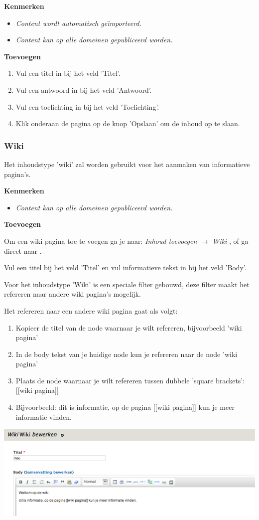 \textbf{Kenmerken}

\begin{itemize}
\item \emph{Content wordt automatisch ge{\"\i}mporteerd.}
\item \emph{Content kan op alle domeinen gepubliceerd worden.}
\end{itemize}

\textbf{Toevoegen}

\begin{enumerate}
\item Vul een titel in bij het veld 'Titel'.
\item Vul een antwoord in bij het veld 'Antwoord'.
\item Vul een toelichting in bij het veld 'Toelichting'.
\item Klik onderaan de pagina op de knop 'Opslaan' om de inhoud op te slaan.
\end{enumerate}

\subsubsection{Wiki}\label{wiki}
Het inhoudstype 'wiki' zal worden gebruikt voor het aanmaken van informatieve pagina's.

\textbf{Kenmerken}

\begin{itemize}
\item \emph{Content kan op alle domeinen gepubliceerd worden.}
\end{itemize}

\textbf{Toevoegen}

Om een wiki pagina toe te voegen ga je naar: \emph{Inhoud toevoegen} $\rightarrow$ \emph{Wiki} , of ga direct naar .

Vul een titel bij het veld 'Titel' en vul informatieve tekst in bij het veld 'Body'.

Voor het inhoudstype 'Wiki' is een speciale filter gebouwd, deze filter maakt het refereren naar andere wiki pagina's mogelijk. 

Het refereren naar een andere wiki pagina gaat als volgt: 

\begin{enumerate}
\item Kopieer de titel van de node waarnaar je wilt refereren, bijvoorbeeld 'wiki pagina'
\item In de body tekst van je huidige node kun je refereren naar de node 'wiki pagina'
\item Plaats de node waarnaar je wilt refereren tussen dubbele 'square brackets': [[wiki pagina]]
\item Bijvoorbeeld: dit is informatie, op de pagina [[wiki pagina]] kun je meer informatie vinden.
\end{enumerate}

\bigskip

\begin{center}
	\includegraphics[width=\textwidth]{img/wiki.png}
\end{center}